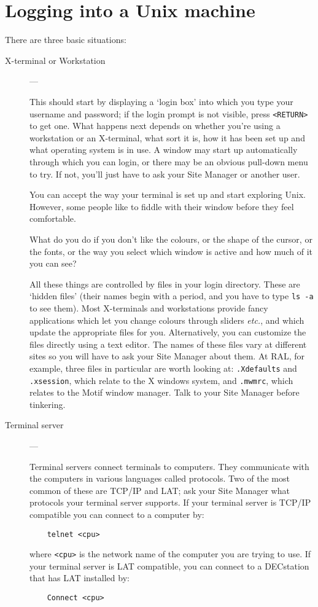 \newpage

\appendix

\section{Logging into a Unix machine}
\label{login}

There are three basic situations:
\begin{description}
\begin{description}

\item [X-terminal or Workstation] ---

This should start by displaying a `login box' into which you type your username
and password; if the login prompt is not visible, press {\tt <RETURN>} to get
one.
What happens next depends on whether you're using a workstation or an
X-terminal, what sort it is, how it has been set up and what operating system
is in use.
A window may start up automatically through which you can login, or there may
be an obvious pull-down menu to try.
If not, you'll just have to ask your Site Manager or another user.

You can accept the way your terminal is set up and start exploring Unix.
However, some people like to fiddle with their window before they feel
comfortable.

What do you do if you don't like the colours, or the shape of the cursor, or
the fonts, or the way you select which window is active and how much of it
you can see?

All these things are controlled by files in your login directory.
These are `hidden files' (their names begin with a period, and you have to
type {\tt ls -a} to see them).
Most X-terminals and workstations provide fancy applications which let you
change colours through sliders {\em etc.}, and which update the appropriate
files for you.
Alternatively, you can customize the files directly using a text editor.
The names of these files vary at different sites so you will have to ask
your Site Manager about them.
At RAL, for example, three files in particular are worth looking at:
{\tt .Xdefaults} and {\tt .xsession}, which relate to the X windows system,
and {\tt .mwmrc}, which relates to the Motif window manager.
Talk to your Site Manager before tinkering.

\item [Terminal server] ---

Terminal servers connect terminals to computers.
They communicate with the computers in various languages called protocols.
Two of the most common of these are TCP/IP and LAT; ask your Site Manager what
protocols your terminal server supports.
If your terminal server is TCP/IP compatible you can connect to a computer by:
\begin{verbatim}
    telnet <cpu>
\end{verbatim}
where {\tt <cpu>} is the network name of the computer you are trying to use.
If your terminal server is LAT compatible, you can connect to a DECstation that
has LAT installed by:
\begin{verbatim}
    Connect <cpu>
\end{verbatim}



\end{description}
\end{description}
